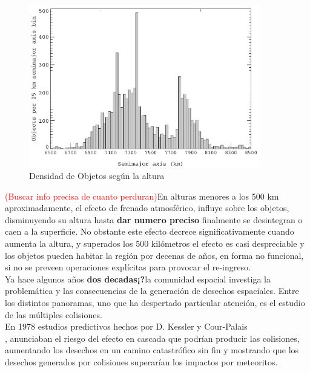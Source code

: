 \begin{figure}[!h]
  \centering
  \includegraphics[width=0.9\textwidth]{imagenes/SDvsaltura2011}
  \caption[Distribuci\'on de Desechos seg\'un la altura en \'orbitas LEO]{Densidad de Objetos seg\'un la altura}
  \label{fig:Dvsaltura}
\end{figure}

\textcolor{red}{(Buscar info precisa de cuanto perduran)}En alturas menores a los 500 km aproximadamente, el efecto de frenado atmosf\'erico, influye sobre los objetos, disminuyendo su altura hasta {\bf{dar numero preciso}} finalmente se desintegran o caen a la superficie. No obstante este efecto decrece significativamente cuando aumenta la altura, y superados los 500 kil\'ometros el efecto es casi despreciable y los objetos pueden habitar la regi\'on por decenas de a\~nos, en forma no funcional, si no se preveen operaciones expl\'icitas para provocar el re-ingreso.\\ 

Ya hace algunos a\~nos {\bf{dos decadas¡?}}la comunidad espacial investiga la problem\'atica y las consecuencias de la generaci\'on de desechos espaciales. Entre los distintos panoramas, uno que ha despertado particular atenci\'on, es el estudio de las m\'ultiples colisiones.\\
En 1978  estudios predictivos hechos por D. Kessler y Cour-Palais\\
 \cite{kessler0}, anunciaban el riesgo del efecto en cascada que podr\'ian producir las colisiones, aumentando los desechos en un camino catastr\'ofico sin fin y mostrando que los desechos generados por colisiones superar\'ian los impactos por meteoritos.\\
 
 

